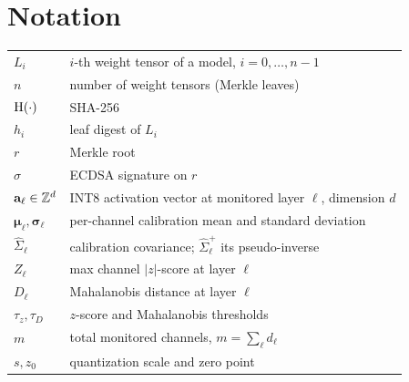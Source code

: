 \chapter*{Notation}
\begin{tabular}{@{}p{2.6cm}p{11cm}@{}}
$L_i$                     & $i$-th weight tensor of a model, $i = 0,\dots,n-1$ \\
$n$                       & number of weight tensors (Merkle leaves) \\
$\mathrm{H}(\cdot)$            & SHA-256 \\
$h_i$                     & leaf digest of $L_i$ \\
$r$                       & Merkle root \\
$\sigma$                  & ECDSA signature on $r$ \\
$\mathbf{a}_\ell\in\mathbb{Z}^{d}$ & INT8 activation vector at monitored layer $\ell$, dimension $d$ \\
$\boldsymbol\mu_\ell,\boldsymbol\sigma_\ell$ & per-channel calibration mean and standard deviation \\
$\hat\Sigma_\ell$         & calibration covariance; $\hat\Sigma_\ell^{+}$ its pseudo-inverse \\
$Z_\ell$                  & max channel $|z|$-score at layer $\ell$ \\
$D_\ell$                  & Mahalanobis distance at layer $\ell$ \\
$\tau_z,\tau_D$           & $z$-score and Mahalanobis thresholds \\
$m$                       & total monitored channels, $m=\sum_\ell d_\ell$ \\
$s, z_0$                  & quantization scale and zero point \\
\end{tabular}
